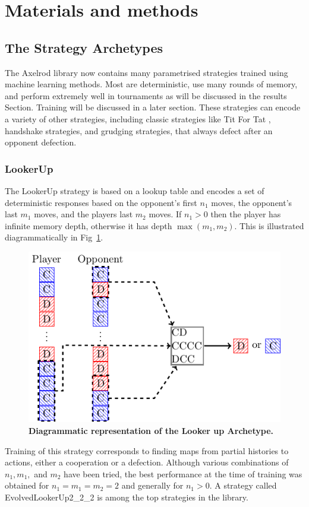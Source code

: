 \documentclass[10pt,letterpaper]{article}
\begin{document}
\section*{Materials and methods}
\subsection*{The Strategy Archetypes}

The Axelrod library now contains many parametrised strategies trained using
machine learning
methods. Most are deterministic, use many rounds of memory, and perform
extremely well in tournaments as will be discussed in the results Section.
Training will be discussed in a later section.
These strategies can encode a variety
of other strategies, including classic strategies like Tit For Tat
\cite{Axelrod1980},
handshake strategies, and grudging strategies, that always defect after
an opponent defection.

\subsubsection*{LookerUp}\label{sec:lookerup}

The LookerUp strategy is based on a lookup table and encodes a set of
deterministic responses based on the opponent's first $n_1$ moves, the
opponent's last $m_1$ moves, and the players last $m_2$ moves. If $n_1 > 0$ then
the player has infinite memory depth, otherwise it has depth $\max(m_1, m_2)$.
This is illustrated diagrammatically in Fig~\ref{fig:lookerup}.

\begin{figure}[!hbtp]
    \centering
    \includegraphics[width=.7\textwidth]{lookerup.pdf}
    \caption{\bf Diagrammatic representation of the Looker up Archetype.}
    \label{fig:lookerup}
\end{figure}

Training of this strategy corresponds to finding maps from partial histories to
actions, either a cooperation or a defection. Although various
combinations of $n_1, m_1,$ and $m_2$ have been tried, the best performance at
the time of
training was obtained for $n_1 = m_1 = m_2 = 2$ and generally for $n_1 > 0$.
A strategy
called EvolvedLookerUp2\_2\_2 is among the top strategies in the library.
\end{document}
